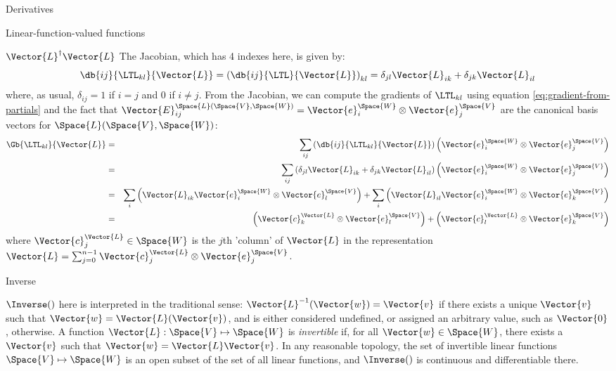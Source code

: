 \begin{plSection}{Derivatives}
\begin{plSection}{Linear-function-valued functions}
\begin{plSection}{\texorpdfstring{$\Vector{L}^{\dagger} \Vector{L}$}{LTL}}
The Jacobian, which has 4 indexes here, is given by:
\begin{equation}
\db{ij}{\LTL_{kl}}{\Vector{L}}
 =
\left( \db{ij}{\LTL}{\Vector{L}} \right)_{kl}
=
\delta_{jl} \Vector{L}_{ik}
+
\delta_{jk} \Vector{L}_{il}
\end{equation}
where, as usual, $\delta_{ij} = 1$ if $i=j$ and  $0$ if $i \neq j$.
From the Jacobian, we can compute the gradients of $\LTL_{kl}$
using equation \ref{eq:gradient-from-partials}
and the fact that
$\Vector{E}_{ij}^{\Space{L}(\Space{V},\Space{W})}  = \Vector{e}_i^{\Space{W}} \otimes \Vector{e}_j^{\Space{V}}$
are the canonical basis vectors for $\Space{L}(\Space{V},\Space{W})$:
\begin{eqnarray}
\Gb{\LTL_{kl}}{\Vector{L}}
& = &
\sum_{ij}
\left( \db{ij}{\LTL_{kl}}{\Vector{L}} \right)
\left( \Vector{e}_i^{\Space{W}} \otimes \Vector{e}_j^{\Space{V}} \right)
\\
& = &
\sum_{ij}
\left( \delta_{jl} \Vector{L}_{ik} + \delta_{jk} \Vector{L}_{il} \right)
\left( \Vector{e}_i^{\Space{W}} \otimes \Vector{e}_j^{\Space{V}} \right)
\nonumber
\\
& = &
\sum_{i}
\left(
\Vector{L}_{ik}  \Vector{e}_i^{\Space{W}} \otimes \Vector{e}_l^{\Space{V}}
\right)
+
\sum_{i}
\left(
\Vector{L}_{il}  \Vector{e}_i^{\Space{W}} \otimes \Vector{e}_k^{\Space{V}}
\right)
\nonumber
\\
& = &
\left(
\Vector{c}_k^{\Vector{L}} \otimes \Vector{e}_l^{\Space{V}}
\right)
+
\left(
\Vector{c}_l^{\Vector{L}} \otimes \Vector{e}_k^{\Space{V}}
\right)
\nonumber
\end{eqnarray}
where $\Vector{c}_j^{\Vector{L}} \in \Space{W}$ is the $j$th 'column' of $\Vector{L}$
in the representation
$\Vector{L} = \sum_{j=0}^{n-1} \Vector{c}_j^{\Vector{L}} \otimes \Vector{e}_j^{\Space{V}}$.

\end{plSection}%
\begin{plSection}{Inverse}
\label{sec:Derivative-of-inverse}

$\Inverse()$ here is interpreted in the traditional sense:
$\Vector{L}^{-1}(\Vector{w}) = \Vector{v}$ if there exists a unique $\Vector{v}$ such that $\Vector{w} = \Vector{L}(\Vector{v})$,
and is either considered undefined, or assigned an arbitrary
value, such as $\Vector{0}$, otherwise.
A function $\Vector{L} : \Space{V} \mapsto \Space{W}$ is \textit{invertible}
if, for all $\Vector{w} \in \Space{W}$, there exists a $\Vector{v}$ such that
$\Vector{w} = \Vector{L} \Vector{v}$.
In any reasonable topology,
the set of invertible linear functions $\Space{V} \mapsto \Space{W}$
is an open subset of the set of all linear functions,
and $\Inverse()$ is continuous and differentiable there.


\end{plSection}
\end{plSection}
\end{plSection}
